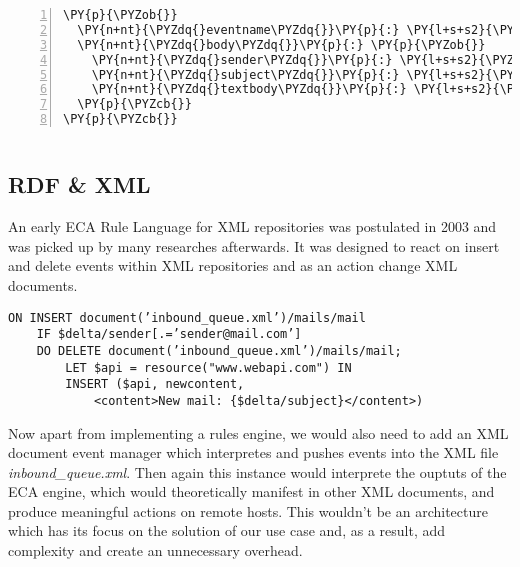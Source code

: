 \begin{Verbatim}[frame=single,fontsize=\footnotesize,commandchars=\\\{\},numbers=left,firstnumber=1,stepnumber=1,xleftmargin
=.3in]
\PY{p}{\PYZob{}}
  \PY{n+nt}{\PYZdq{}eventname\PYZdq{}}\PY{p}{:} \PY{l+s+s2}{\PYZdq{}email\PYZdq{}}\PY{p}{,}
  \PY{n+nt}{\PYZdq{}body\PYZdq{}}\PY{p}{:} \PY{p}{\PYZob{}}
    \PY{n+nt}{\PYZdq{}sender\PYZdq{}}\PY{p}{:} \PY{l+s+s2}{\PYZdq{}sender@mail.com\PYZdq{}}\PY{p}{,}
    \PY{n+nt}{\PYZdq{}subject\PYZdq{}}\PY{p}{:} \PY{l+s+s2}{\PYZdq{}Important subject!\PYZdq{}}\PY{p}{,}
    \PY{n+nt}{\PYZdq{}textbody\PYZdq{}}\PY{p}{:} \PY{l+s+s2}{\PYZdq{}Hi User,\PYZbs{}n\PYZbs{}nThis is a lengthy mail body\PYZdq{}}
  \PY{p}{\PYZcb{}}
\PY{p}{\PYZcb{}}
\end{Verbatim}
\begin{lstlisting}[label=lstemail,caption=Example E-Mail event expressed in JSON]
\end{lstlisting}

\subsection{RDF \& XML}
An early ECA Rule Language for XML repositories\cite{Papamarkos03event-condition-actionrule} was postulated in 2003 and was picked up by many researches afterwards. It was designed to react on insert and delete events within XML repositories and as an action change XML documents.

\begin{lstlisting}[frame=single,float=h,label=lstrdf,language=RDF,caption=E-Mail Example rule expressed in RDF]
	ON INSERT document(’inbound_queue.xml’)/mails/mail
	IF $delta/sender[.=’sender@mail.com’]
	DO DELETE document(’inbound_queue.xml’)/mails/mail;
		LET $api = resource("www.webapi.com") IN
		INSERT ($api, newcontent,
			<content>New mail: {$delta/subject}</content>)
\end{lstlisting}


Now apart from implementing a rules engine, we would also need to add an XML document event manager which interpretes and pushes events into the XML file \emph{inbound\_queue.xml}. Then again this instance would interprete the ouptuts of the ECA engine, which would theoretically manifest in other XML documents, and produce meaningful actions on remote hosts. This wouldn't be an architecture which has its focus on the solution of our use case and, as a result, add complexity and create an unnecessary overhead.

